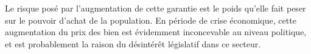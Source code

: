 
\smallbreak Le risque posé par l'augmentation de cette garantie est le poids qu'elle fait peser sur le pouvoir d'achat de la population.
En période de crise économique, cette augmentation du prix des bien est évidemment inconcevable au niveau politique, et est probablement la raison du désintérêt législatif dans ce secteur.
